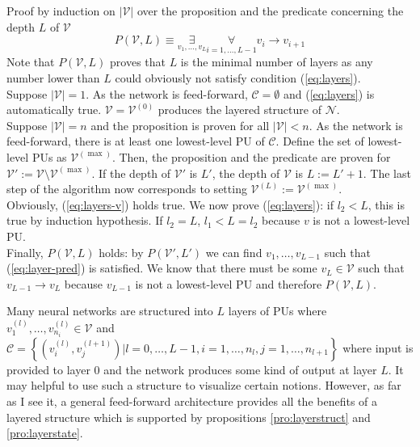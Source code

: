 \documentclass[a4paper,11pt]{article}
\begin{document}
\begin{Bew}
Proof by induction on $|\mathcal{V}|$ over the proposition and the predicate concerning the depth $L$ of $\mathcal{V}$
\begin{equation}\label{eq:layer-pred}
P(\mathcal{V},L)\equiv\underset{v_1,\dotsc,v_L}{\exists}\underset{i=1,\dotsc,L-1}{\forall}v_i\to v_{i+1}
\end{equation}
Note that $P(\mathcal{V},L)$ proves that $L$ is the minimal number of layers as any number lower than $L$ could obviously not satisfy condition (\ref{eq:layers}).\\
Suppose $|\mathcal{V}|=1$. As the network is feed-forward, $\mathcal{C}=\emptyset$ and (\ref{eq:layers}) is automatically true. $\mathcal{V}=\mathcal{V}^{(0)}$ produces the layered structure of $\mathcal{N}$.\\
Suppose $|\mathcal{V}|=n$ and the proposition is proven for all $|\mathcal{V}|<n$. As the network is feed-forward, there is at least one lowest-level PU of $\mathcal{C}$. Define the set of lowest-level PUs as $\mathcal{V}^{(\max)}$. Then, the proposition and the predicate are proven for $\mathcal{V}':=\mathcal{V}\setminus\mathcal{V}^{(\max)}$. If the depth of $\mathcal{V}'$ is $L'$, the depth of $\mathcal{V}$ is $L:=L'+1$. The last step of the algorithm now corresponds to setting $\mathcal{V}^{(L)}:=\mathcal{V}^{(\max)}$.\\
Obviously, (\ref{eq:layers-v}) holds true. We now prove (\ref{eq:layers}): if $l_2<L$, this is true by induction hypothesis. If $l_2=L$, $l_1<L=l_2$ because $v$ is not a lowest-level PU.\\
Finally, $P(\mathcal{V},L)$ holds: by $P(\mathcal{V}',L')$ we can find $v_1,\dotsc,v_{L-1}$ such that (\ref{eq:layer-pred}) is satisfied. We know that there must be some $v_L\in\mathcal{V}$ such that $v_{L-1}\to v_L$ because $v_{L-1}$ is not a lowest-level PU and therefore $P(\mathcal{V},L)$.
\end{Bew}
\begin{Abs}
Many neural networks are structured into $L$ layers of PUs where $v_1^{(l)},\dotsc,v_{n_i}^{(l)}\in\mathcal{V}$ and $\mathcal{C}=\left\{(v_i^{(l)},v_j^{(l+1)})|l=0,\dotsc,L-1,i=1,\dotsc,n_l,j=1,\dotsc,n_{l+1}\right\}$ where input is provided to layer $0$ and the network produces some kind of output at layer $L$. It may helpful to use such a structure to visualize certain notions. However, as far as I see it, a general feed-forward architecture provides all the benefits of a layered structure which is supported by propositions \ref{pro:layerstruct} and \ref{pro:layerstate}.
\end{Abs}
\end{document}
